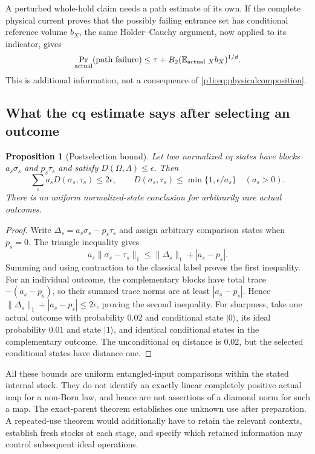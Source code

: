 \documentclass[11pt]{article}
\numberwithin{equation}{section}
\newtheorem{proposition}[theorem]{Proposition}
\theoremstyle{definition}
\theoremstyle{remark}
\begin{document}
A perturbed whole-hold claim needs a path estimate of its own. If the
complete physical current proves that the possibly failing entrance
set has conditional reference volume $b_X$, the same H\"older--Cauchy
argument, now applied to its indicator, gives
\begin{equation}\label{p1i:eq:pathfee}
 \Pr_{\rm actual}(\text{path failure})
 \leq\tau+B_2(\mathbb E_{\mathrm{actual}\ X}b_X)^{1/d}.
\end{equation}
This is additional information, not a consequence of
\eqref{p1i:eq:physicalcomposition}.

\subsection{What the cq estimate says after selecting an outcome}

\begin{proposition}[Postselection bound]\label{p1i:prop:postselection}
Let two normalized cq states have blocks $a_s\sigma_s$ and $p_s\tau_s$
and satisfy $D(\Omega,\Lambda)\leq\epsilon$. Then
\begin{equation}\label{p1i:eq:postselection}
 \sum_s a_sD(\sigma_s,\tau_s)\leq2\epsilon,
 \qquad
 D(\sigma_s,\tau_s)\leq\min\{1,\epsilon/a_s\}\quad(a_s>0).
\end{equation}
There is no uniform normalized-state conclusion for arbitrarily rare
actual outcomes.
\end{proposition}

\begin{proof}
Write $\Delta_s=a_s\sigma_s-p_s\tau_s$ and assign arbitrary comparison
states when $p_s=0$. The triangle inequality gives
\[
 a_s\|\sigma_s-\tau_s\|_1
             \leq\|\Delta_s\|_1+|a_s-p_s|.
\]
Summing and using contraction to the classical label proves the first
inequality. For an individual outcome, the complementary blocks have
total trace $-(a_s-p_s)$, so their summed trace norms are at least
$|a_s-p_s|$. Hence
$\|\Delta_s\|_1+|a_s-p_s|\leq2\epsilon$, proving the second inequality.
For sharpness, take one actual outcome with probability $0.02$ and
conditional state $|0\rangle$, its ideal probability $0.01$ and state
$|1\rangle$, and identical conditional states in the complementary
outcome. The unconditional cq distance is $0.02$, but the selected
conditional states have distance one.
\end{proof}

All these bounds are uniform entangled-input comparisons within the
stated internal stock. They do not identify an exactly linear completely
positive actual map for a non-Born law, and hence are not assertions of
a diamond norm for such a map. The exact-parent theorem establishes one
unknown use after preparation. A repeated-use theorem would additionally
have to retain the relevant contexts, establish fresh stocks at each
stage, and specify which retained information may control subsequent
ideal operations.
\end{document}
